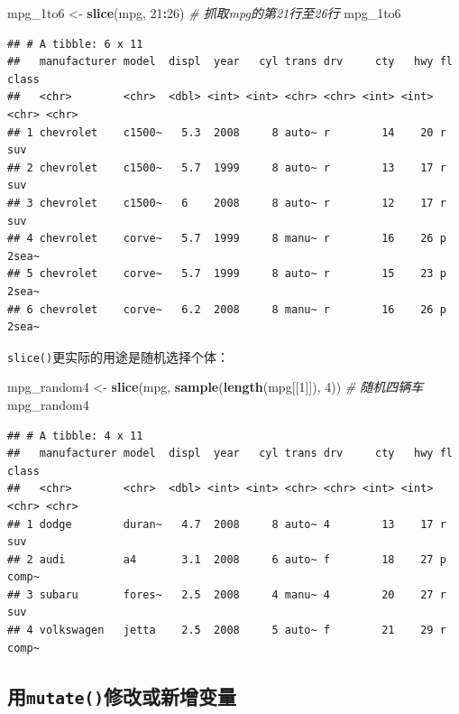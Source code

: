 \documentclass[]{book}
\newenvironment{Shaded}{\begin{snugshade}}{\end{snugshade}}
\newcommand{\CommentTok}[1]{\textcolor[rgb]{0.56,0.35,0.01}{\textit{#1}}}
\newcommand{\DecValTok}[1]{\textcolor[rgb]{0.00,0.00,0.81}{#1}}
\newcommand{\KeywordTok}[1]{\textcolor[rgb]{0.13,0.29,0.53}{\textbf{#1}}}
\newcommand{\NormalTok}[1]{#1}
\newcommand{\OperatorTok}[1]{\textcolor[rgb]{0.81,0.36,0.00}{\textbf{#1}}}
\newcommand{\StringTok}[1]{\textcolor[rgb]{0.31,0.60,0.02}{#1}}
\begin{document}
\begin{Shaded}
\begin{Highlighting}[]
\NormalTok{mpg_1to6 <-}\StringTok{ }\KeywordTok{slice}\NormalTok{(mpg, }\DecValTok{21}\OperatorTok{:}\DecValTok{26}\NormalTok{) }\CommentTok{# 抓取mpg的第21行至26行}
\NormalTok{mpg_1to6}
\end{Highlighting}
\end{Shaded}

\begin{verbatim}
## # A tibble: 6 x 11
##   manufacturer model  displ  year   cyl trans drv     cty   hwy fl    class
##   <chr>        <chr>  <dbl> <int> <int> <chr> <chr> <int> <int> <chr> <chr>
## 1 chevrolet    c1500~   5.3  2008     8 auto~ r        14    20 r     suv  
## 2 chevrolet    c1500~   5.7  1999     8 auto~ r        13    17 r     suv  
## 3 chevrolet    c1500~   6    2008     8 auto~ r        12    17 r     suv  
## 4 chevrolet    corve~   5.7  1999     8 manu~ r        16    26 p     2sea~
## 5 chevrolet    corve~   5.7  1999     8 auto~ r        15    23 p     2sea~
## 6 chevrolet    corve~   6.2  2008     8 manu~ r        16    26 p     2sea~
\end{verbatim}

\texttt{slice()}更实际的用途是随机选择个体：

\begin{Shaded}
\begin{Highlighting}[]
\NormalTok{mpg_random4 <-}\StringTok{ }\KeywordTok{slice}\NormalTok{(mpg, }\KeywordTok{sample}\NormalTok{(}\KeywordTok{length}\NormalTok{(mpg[[}\DecValTok{1}\NormalTok{]]), }\DecValTok{4}\NormalTok{)) }\CommentTok{# 随机四辆车}
\NormalTok{mpg_random4}
\end{Highlighting}
\end{Shaded}

\begin{verbatim}
## # A tibble: 4 x 11
##   manufacturer model  displ  year   cyl trans drv     cty   hwy fl    class
##   <chr>        <chr>  <dbl> <int> <int> <chr> <chr> <int> <int> <chr> <chr>
## 1 dodge        duran~   4.7  2008     8 auto~ 4        13    17 r     suv  
## 2 audi         a4       3.1  2008     6 auto~ f        18    27 p     comp~
## 3 subaru       fores~   2.5  2008     4 manu~ 4        20    27 r     suv  
## 4 volkswagen   jetta    2.5  2008     5 auto~ f        21    29 r     comp~
\end{verbatim}

\hypertarget{mutate}{%
\subsection{\texorpdfstring{用\texttt{mutate()}修改或新增变量}{用mutate()修改或新增变量}}\label{mutate}}
\end{document}
